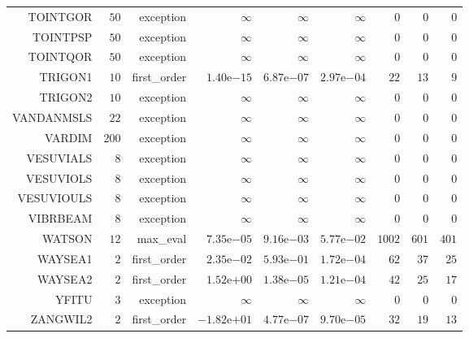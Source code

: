 \begin{longtable}{rrrrrrrrr}
TOINTGOR & \(    50\) & exception & \(\infty\) & \(\infty\) & \(\infty\) & \(     0\) & \(     0\) & \(     0\) \\
TOINTPSP & \(    50\) & exception & \(\infty\) & \(\infty\) & \(\infty\) & \(     0\) & \(     0\) & \(     0\) \\
TOINTQOR & \(    50\) & exception & \(\infty\) & \(\infty\) & \(\infty\) & \(     0\) & \(     0\) & \(     0\) \\
TRIGON1 & \(    10\) & first\_order & \( 1.40\)e\(-15\) & \( 6.87\)e\(-07\) & \( 2.97\)e\(-04\) & \(    22\) & \(    13\) & \(     9\) \\
TRIGON2 & \(    10\) & exception & \(\infty\) & \(\infty\) & \(\infty\) & \(     0\) & \(     0\) & \(     0\) \\
VANDANMSLS & \(    22\) & exception & \(\infty\) & \(\infty\) & \(\infty\) & \(     0\) & \(     0\) & \(     0\) \\
VARDIM & \(   200\) & exception & \(\infty\) & \(\infty\) & \(\infty\) & \(     0\) & \(     0\) & \(     0\) \\
VESUVIALS & \(     8\) & exception & \(\infty\) & \(\infty\) & \(\infty\) & \(     0\) & \(     0\) & \(     0\) \\
VESUVIOLS & \(     8\) & exception & \(\infty\) & \(\infty\) & \(\infty\) & \(     0\) & \(     0\) & \(     0\) \\
VESUVIOULS & \(     8\) & exception & \(\infty\) & \(\infty\) & \(\infty\) & \(     0\) & \(     0\) & \(     0\) \\
VIBRBEAM & \(     8\) & exception & \(\infty\) & \(\infty\) & \(\infty\) & \(     0\) & \(     0\) & \(     0\) \\
WATSON & \(    12\) & max\_eval & \( 7.35\)e\(-05\) & \( 9.16\)e\(-03\) & \( 5.77\)e\(-02\) & \(  1002\) & \(   601\) & \(   401\) \\
WAYSEA1 & \(     2\) & first\_order & \( 2.35\)e\(-02\) & \( 5.93\)e\(-01\) & \( 1.72\)e\(-04\) & \(    62\) & \(    37\) & \(    25\) \\
WAYSEA2 & \(     2\) & first\_order & \( 1.52\)e\(+00\) & \( 1.38\)e\(-05\) & \( 1.21\)e\(-04\) & \(    42\) & \(    25\) & \(    17\) \\
YFITU & \(     3\) & exception & \(\infty\) & \(\infty\) & \(\infty\) & \(     0\) & \(     0\) & \(     0\) \\
ZANGWIL2 & \(     2\) & first\_order & \(-1.82\)e\(+01\) & \( 4.77\)e\(-07\) & \( 9.70\)e\(-05\) & \(    32\) & \(    19\) & \(    13\) \\\hline
\end{longtable}
